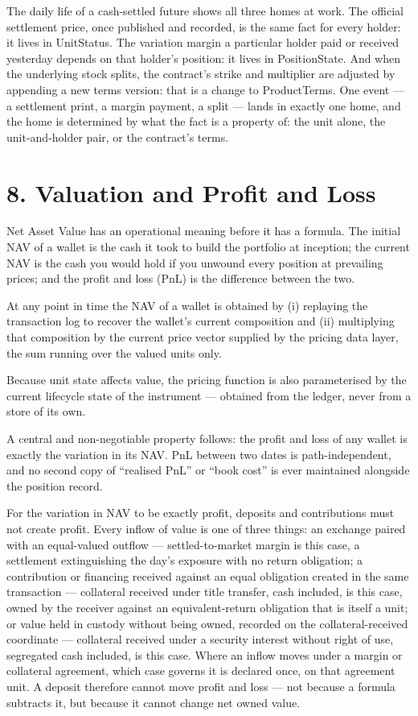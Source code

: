 \documentclass[11pt,a4paper]{article}
\begin{document}
The daily life of a cash-settled future shows all three homes at work.
The official settlement price, once published and recorded, is the same
fact for every holder: it lives in UnitStatus. The variation margin a
particular holder paid or received yesterday depends on that holder's
position: it lives in PositionState. And when the underlying stock
splits, the contract's strike and multiplier are adjusted by appending a
new terms version: that is a change to ProductTerms. One event --- a
settlement print, a margin payment, a split --- lands in exactly one
home, and the home is determined by what the fact is a property of: the
unit alone, the unit-and-holder pair, or the contract's terms.

\hypertarget{valuation-and-profit-and-loss}{%
\section{8. Valuation and Profit and
Loss}\label{valuation-and-profit-and-loss}}

Net Asset Value has an operational meaning before it has a formula. The
initial NAV of a wallet is the cash it took to build the portfolio at
inception; the current NAV is the cash you would hold if you unwound
every position at prevailing prices; and the profit and loss (PnL) is
the difference between the two.

At any point in time the NAV of a wallet is obtained by (i) replaying
the transaction log to recover the wallet's current composition and (ii)
multiplying that composition by the current price vector supplied by the
pricing data layer, the sum running over the valued units only.

Because unit state affects value, the pricing function is also
parameterised by the current lifecycle state of the instrument ---
obtained from the ledger, never from a store of its own.

A central and non-negotiable property follows: the profit and loss of
any wallet is exactly the variation in its NAV. PnL between two dates is
path-independent, and no second copy of ``realised PnL'' or ``book
cost'' is ever maintained alongside the position record.

For the variation in NAV to be exactly profit, deposits and
contributions must not create profit. Every inflow of value is one of
three things: an exchange paired with an equal-valued outflow ---
settled-to-market margin is this case, a settlement extinguishing the
day's exposure with no return obligation; a contribution or financing
received against an equal obligation created in the same transaction ---
collateral received under title transfer, cash included, is this case,
owned by the receiver against an equivalent-return obligation that is
itself a unit; or value held in custody without being owned, recorded on
the collateral-received coordinate --- collateral received under a
security interest without right of use, segregated cash included, is
this case. Where an inflow moves under a margin or collateral agreement,
which case governs it is declared once, on that agreement unit. A
deposit therefore cannot move profit
and loss --- not because a formula subtracts it, but because it cannot
change net owned value.
\end{document}
